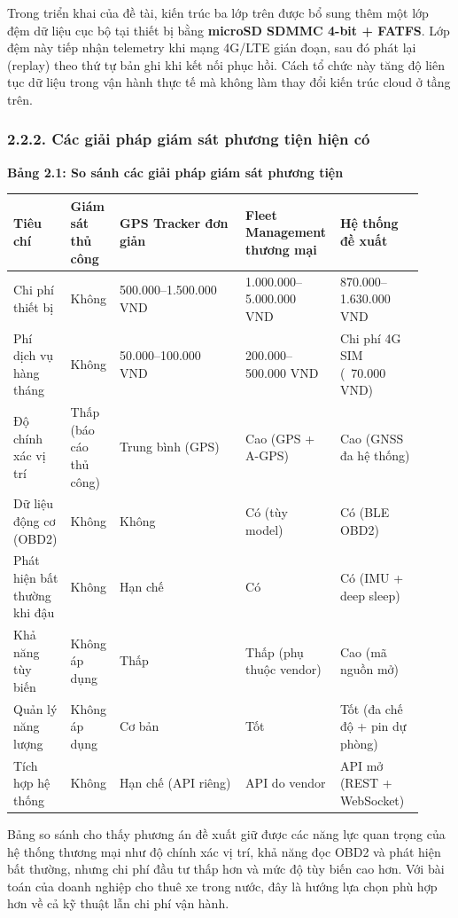 \documentclass[13pt,a4paper]{extarticle}
\newcounter{none} %
\newcommand{\thesislongtableorignewline}{}
\let\thesislongtableorignewline\\
\renewcommand{\\}{\thesislongtableorignewline\hline}%
\let\\\thesislongtableorignewline
\newcommand{\thesistabletitle}[1]{%
  \begin{center}\textbf{#1}\end{center}%
}
\begin{document}
Trong triển khai của đề tài, kiến trúc ba lớp trên được bổ sung thêm một
lớp đệm dữ liệu cục bộ tại thiết bị bằng \textbf{microSD SDMMC 4-bit +
FATFS}. Lớp đệm này tiếp nhận telemetry khi mạng 4G/LTE gián đoạn, sau
đó phát lại (replay) theo thứ tự bản ghi khi kết nối phục hồi. Cách tổ
chức này tăng độ liên tục dữ liệu trong vận hành thực tế mà không làm
thay đổi kiến trúc cloud ở tầng trên.

\subsubsection{2.2.2. Các giải pháp giám sát phương tiện hiện
có}\label{222-cuxe1c-giux1ea3i-phuxe1p-giuxe1m-suxe1t-phux1b0ux1a1ng-tiux1ec7n-hiux1ec7n-cuxf3}

\thesistabletitle{Bảng 2.1: So sánh các giải pháp giám sát phương tiện}

{\def\LTcaptype{none} %
\begin{longtable}{|p{0.12\linewidth}|p{0.10\linewidth}|p{0.30\linewidth}|p{0.20\linewidth}|p{0.20\linewidth}|}
\hline \textbf{Tiêu chí} & \textbf{Giám sát thủ công} & \textbf{GPS Tracker đơn giản} & \textbf{Fleet Management
thương mại} & \textbf{Hệ thống đề xuất} \\
\hline
\endhead
\hline
\endlastfoot
Chi phí thiết bị & Không & 500.000--1.500.000 VND & 1.000.000--5.000.000
VND & 870.000--1.630.000 VND \\
Phí dịch vụ hàng tháng & Không & 50.000--100.000 VND & 200.000--500.000
VND & Chi phí 4G SIM (~70.000 VND) \\
Độ chính xác vị trí & Thấp (báo cáo thủ công) & Trung bình (GPS) & Cao
(GPS + A-GPS) & Cao (GNSS đa hệ thống) \\
Dữ liệu động cơ (OBD2) & Không & Không & Có (tùy model) & Có (BLE
OBD2) \\
Phát hiện bất thường khi đậu & Không & Hạn chế & Có & Có (IMU + deep
sleep) \\
Khả năng tùy biến & Không áp dụng & Thấp & Thấp (phụ thuộc vendor) & Cao
(mã nguồn mở) \\
Quản lý năng lượng & Không áp dụng & Cơ bản & Tốt & Tốt (đa chế độ + pin
dự phòng) \\
Tích hợp hệ thống & Không & Hạn chế (API riêng) & API do vendor & API mở
(REST + WebSocket) \\
\end{longtable}
}

Bảng so sánh cho thấy phương án đề xuất giữ được các năng lực quan trọng
của hệ thống thương mại như độ chính xác vị trí, khả năng đọc OBD2 và
phát hiện bất thường, nhưng chi phí đầu tư thấp hơn và mức độ tùy biến
cao hơn. Với bài toán của doanh nghiệp cho thuê xe trong nước, đây là
hướng lựa chọn phù hợp hơn về cả kỹ thuật lẫn chi phí vận hành.
\end{document}
